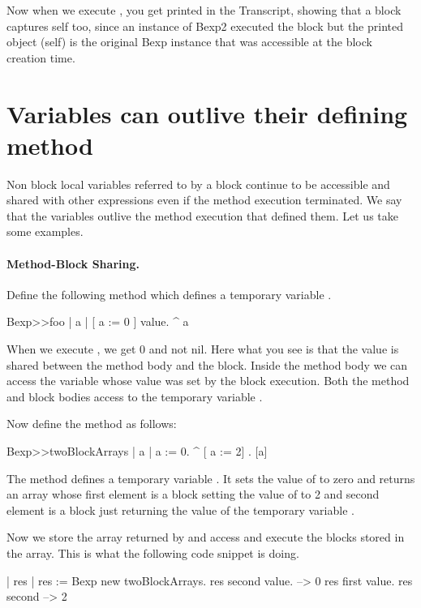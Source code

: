 \documentclass[a4paper,10pt,twoside]{book}
\begin{document}
Now when we execute , you get  printed in the Transcript, showing that a block captures self too, since an instance of Bexp2 executed the block but the printed object (self) is the original Bexp instance that was accessible at the block creation time.


\section{Variables can outlive their defining method}

Non block local variables referred to by a block continue to be accessible and shared with other expressions even if the method execution terminated. We say that the variables outlive the method execution that defined them.
Let us take some examples.

\paragraph{Method-Block Sharing.} Define the following method  which defines a temporary variable .

\begin{code}{}
Bexp>>foo
	| a |
	[ a := 0 ] value.
	^ a
\end{code}

When we execute , we get 0 and not nil.
Here what you see is that the value is shared between the method body and the block. Inside the method body we can access the variable whose value was set by the block execution.
Both the method  and block bodies access to the temporary variable .

Now define the method  as follows:

\begin{code}{}
Bexp>>twoBlockArrays
	| a |
	a := 0.
	^ {[ a := 2] . [a]}
\end{code}

The method  defines a temporary variable . It sets the value of 
to zero and returns an array whose first element is a block setting the value of  to 2 and second element is a block just returning the value of the temporary variable .

Now we store the array returned by  and access and execute the blocks stored in the array. This is what the following code snippet is doing.

\begin{code}{}
| res |
res := Bexp new twoBlockArrays.
res second value.
     --> 0
res first value.
res second
     --> 2
\end{code}
\end{document}
